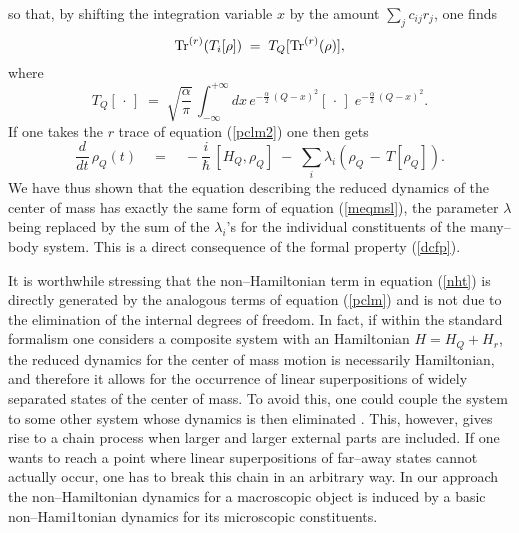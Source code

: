 \documentclass[12pt]{article}
\begin{document}
so that, by shifting the integration variable $x$ by the amount
$\sum_{j} c_{ij} r_{j}$, one finds
\begin{equation} \label{dcfp}
\makebox{Tr}^{(r)}(T_{i}[\rho])\; = \; T_{Q}[
\makebox{Tr}^{(r)}(\rho)],
\end{equation}
where
\begin{equation}
T_{Q}[\,\cdot\,] \; = \; \sqrt{\frac{\alpha}{\pi}}\,
\int_{-\infty}^{+\infty} dx\, e^{\displaystyle -
\frac{\alpha}{2}\, (Q - x)^{2}} [\,\cdot\,]\; e^{\displaystyle -
\frac{\alpha}{2}\, (Q - x)^{2}}.
\end{equation}
If one takes the $r$ trace of equation (\ref{pclm2}) one then gets
\begin{equation} \label{nht}
\frac{d}{dt}\, \rho_{Q}(t) \quad = \quad -\frac{i}{\hbar}\,
[H_{Q}, \rho_{Q}] \; - \; \sum_{i} \lambda_{i} \left(\rho_{Q}\, -
\, T[\rho_{Q}]\right).
\end{equation}
We have thus shown that the equation describing the reduced
dynamics of the center  of mass has exactly the same form of
equation (\ref{meqmsl}), the parameter $\lambda$ being replaced by
the sum of the $\lambda_{i}$'s for the individual constituents of
the many--body system. This is a direct consequence of the formal
property (\ref{dcfp}).

It is worthwhile stressing that the non--Hamiltonian term in
equation (\ref{nht}) is directly generated by the analogous terms
of equation (\ref{pclm}) and is not due to the elimination of the
internal degrees of freedom. In fact, if within the standard
formalism one considers a composite system with an Hamiltonian $H
= H_{Q} + H_{r}$, the reduced dynamics for the center  of mass
motion is necessarily Hamiltonian, and therefore it allows for the
occurrence of linear superpositions of widely separated  states of
the center   of mass. To avoid this, one could couple the system
to some other system whose dynamics is then eliminated
\cite{krauqm}. This, however, gives rise to a chain process when
larger and larger external parts are included. If one wants to
reach a point where linear superpositions of far--away states
cannot actually occur, one has to break this chain in an arbitrary
way. In our approach the non--Hamiltonian dynamics for a
macroscopic object is induced by a basic non--Hami1tonian dynamics
for its microscopic constituents.
\end{document}
